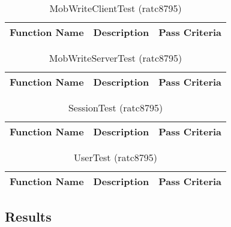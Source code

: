 \documentclass[14pt, a4paper]{article}
\begin{document}
\begin{table}[h]
	\centering
	\caption{MobWriteClientTest (ratc8795)}
	\begin{tabular}{|p{4cm}|p{5cm}|p{6cm}|}
		\hline
		\textbf{Function Name} & \textbf{Description} & \textbf{Pass Criteria}  \\\hline
	\end{tabular}
\end{table}
\begin{table}[h]
	\centering
	\caption{MobWriteServerTest (ratc8795)}
	\begin{tabular}{|p{4cm}|p{5cm}|p{6cm}|}
		\hline
		\textbf{Function Name} & \textbf{Description} & \textbf{Pass Criteria}  \\\hline
	\end{tabular}
\end{table}
\begin{table}[h]
	\centering
	\caption{SessionTest (ratc8795)}
	\begin{tabular}{|p{4cm}|p{5cm}|p{6cm}|}
		\hline
		\textbf{Function Name} & \textbf{Description} & \textbf{Pass Criteria}  \\\hline
	\end{tabular}
\end{table}
\begin{table}[h]
	\centering
	\caption{UserTest (ratc8795)}
	\begin{tabular}{|p{4cm}|p{5cm}|p{6cm}|}
		\hline
		\textbf{Function Name} & \textbf{Description} & \textbf{Pass Criteria}  \\\hline
	\end{tabular}
\end{table}

\newpage

\subsection{Results}
\end{document}
